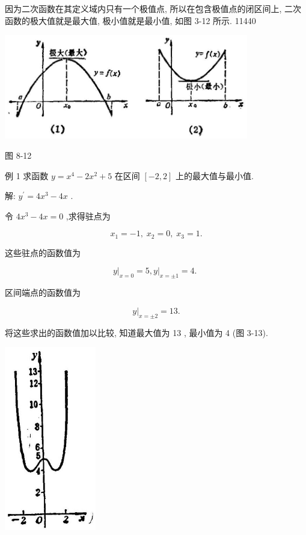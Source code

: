 \documentclass[lang=cn,newtx,12pt,scheme=chinese]{elegantbook}
\begin{document}
因为二次函数在其定义域内只有一个极值点, 所以在包含极值点的闭区间上, 二次函数的极大值就是最大值, 极小值就是最小值, 如图 3-12 所示. 11440

\begin{center}
\includegraphics[max width=0.8\textwidth]{images/01912c18-5c3f-733d-b775-749ba9897a9d_147_605988.jpg}
\end{center}

图 8-12

例 1 求函数 \(y = {x}^{4} - 2{x}^{2} + 5\) 在区间 \(\left\lbrack {-2,2}\right\rbrack\) 上的最大值与最小值.

解: \({y}^{\prime } = 4{x}^{3} - {4x}\) .

令 \(4{x}^{3} - {4x} = 0\) ,求得驻点为

\[
{x}_{1} = - 1,\;{x}_{2} = 0,\;{x}_{3} = 1.
\]

这些驻点的函数值为

\[
{\left. y\right| }_{x = 0} = 5,{\left. y\right| }_{x = \pm 1} = 4\text{. }
\]

区间端点的函数值为

\[
{\left. y\right| }_{x = \pm 2} = {13}\text{.}
\]

将这些求出的函数值加以比较, 知道最大值为 13 , 最小值为 4 (图 3-13).

\begin{center}
\includegraphics[max width=0.3\textwidth]{images/01912c18-5c3f-733d-b775-749ba9897a9d_148_436471.jpg}
\end{center}
\end{document}
